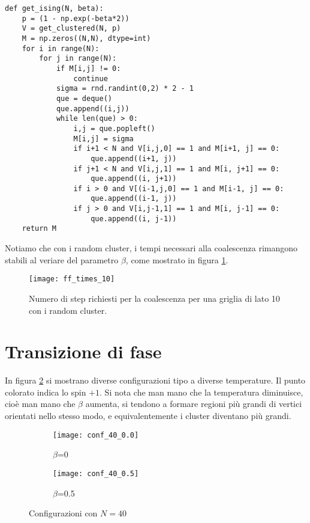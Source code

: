 \documentclass[]{marticle}
\begin{document}
\begin{lstlisting}
def get_ising(N, beta):
    p = (1 - np.exp(-beta*2))
    V = get_clustered(N, p)
    M = np.zeros((N,N), dtype=int)
    for i in range(N):
        for j in range(N):
            if M[i,j] != 0:
                continue
            sigma = rnd.randint(0,2) * 2 - 1
            que = deque()
            que.append((i,j))
            while len(que) > 0:
                i,j = que.popleft()
                M[i,j] = sigma
                if i+1 < N and V[i,j,0] == 1 and M[i+1, j] == 0:
                    que.append((i+1, j))
                if j+1 < N and V[i,j,1] == 1 and M[i, j+1] == 0:
                    que.append((i, j+1))
                if i > 0 and V[(i-1,j,0] == 1 and M[i-1, j] == 0:
                    que.append((i-1, j))
                if j > 0 and V[i,j-1,1] == 1 and M[i, j-1] == 0:
                    que.append((i, j-1))
    return M
\end{lstlisting}

Notiamo che con i random cluster, i tempi necessari alla coalescenza rimangono
stabili al veriare del parametro $\beta$, come mostrato in figura
\ref{fig:plot2}.

\begin{figure}[]
\texttt{[image: ff\_times\_10]}
\caption{Numero di step richiesti per la coalescenza per una griglia di lato 10
    con i random cluster.}
\label{fig:plot2}
\centering
\end{figure}

\section{Transizione di fase} In figura \ref{fig:plot3} si mostrano diverse
configurazioni tipo a diverse temperature. Il punto colorato indica lo spin
$+1$. Si nota che man mano che la temperatura diminuisce, cio\`e man mano che
$\beta$ aumenta, si tendono a formare regioni pi\`u grandi di vertici orientati
nello stesso modo, e equivalentemente i cluster diventano pi\`u grandi. 

\begin{figure}[]
\begin{subfigure}{.5\textwidth}
  \centering
  \texttt{[image: conf\_40\_0.0]}
  \caption{$\beta$=0}
\end{subfigure}%
\begin{subfigure}{.5\textwidth}
  \centering
  \texttt{[image: conf\_40\_0.5]}
  \caption{$\beta$=0.5}
\end{subfigure}%
\caption{Configurazioni con $N=40$}
\label{fig:plot3}
\centering
\end{figure}
\end{document}
